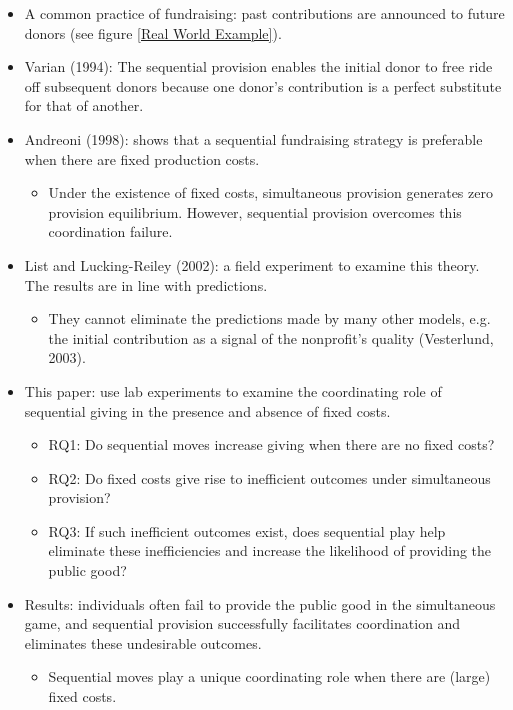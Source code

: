 \documentclass[../root]{subfiles}
\begin{document}
    \begin{itemize}
        \item A common practice of fundraising: past contributions are announced to future donors (see figure \ref{Real World Example}).
        \item Varian (1994): The sequential provision enables the initial donor to free ride off subsequent donors because one donor's contribution is a perfect substitute for that of another. 
        \item Andreoni (1998): shows that a sequential fundraising strategy is preferable when there are fixed production costs.
        \begin{itemize}
            \item Under the existence of fixed costs, simultaneous provision generates zero provision equilibrium. However, sequential provision overcomes this coordination failure.
        \end{itemize}
        \item List and Lucking-Reiley (2002): a field experiment to examine this theory. The results are in line with predictions.
        \begin{itemize}
            \item They cannot eliminate the predictions made by many other models, e.g. the initial contribution as a signal of the nonprofit's quality (Vesterlund, 2003).
        \end{itemize}
        \item This paper: use lab experiments to examine the coordinating role of sequential giving in the presence and absence of fixed costs.
        \begin{itemize}
            \item RQ1: Do sequential moves increase giving when there are no fixed costs?
            \item RQ2: Do fixed costs give rise to inefficient outcomes under simultaneous provision?
            \item RQ3: If such inefficient outcomes exist, does sequential play help eliminate these inefficiencies and increase the likelihood of providing the public good?
        \end{itemize}
        \item Results: individuals often fail to provide the public good in the simultaneous game, and sequential provision successfully facilitates coordination and eliminates these undesirable outcomes.
        \begin{itemize}
            \item Sequential moves play a unique coordinating role when there are (large) fixed costs.
        \end{itemize}
    \end{itemize}
\end{document}
